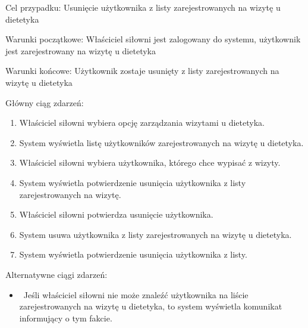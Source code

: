 \documentclass[
]{article}
\providecommand{\tightlist}{%
  \setlength{\itemsep}{0pt}\setlength{\parskip}{0pt}}
\begin{document}
{Cel przypadku: Usunięcie użytkownika z listy zarejestrowanych na wizytę
u dietetyka}

{Warunki początkowe: Właściciel siłowni jest zalogowany do systemu,
użytkownik jest zarejestrowany na wizytę u dietetyka}

{Warunki końcowe: Użytkownik zostaje usunięty z listy zarejestrowanych
na wizytę u dietetyka}

{Główny ciąg zdarzeń:}

\begin{enumerate}
\tightlist
\item
  {Właściciel siłowni wybiera opcję zarządzania wizytami u dietetyka.}
\item
  {System wyświetla listę użytkowników zarejestrowanych na wizytę u
  dietetyka.}
\item
  {Właściciel siłowni wybiera użytkownika, którego chce wypisać z
  wizyty.}
\item
  {System wyświetla potwierdzenie usunięcia użytkownika z listy
  zarejestrowanych na wizytę.}
\item
  {Właściciel siłowni potwierdza usunięcie użytkownika.}
\item
  {System usuwa użytkownika z listy zarejestrowanych na wizytę u
  dietetyka.}
\item
  {System wyświetla potwierdzenie usunięcia użytkownika z listy.}
\end{enumerate}

{Alternatywne ciągi zdarzeń:}

\begin{itemize}
\tightlist
\item
  {~Jeśli właściciel siłowni nie może znaleźć użytkownika na liście
  zarejestrowanych na wizytę u dietetyka, to system wyświetla komunikat
  informujący o tym fakcie.}
\end{itemize}

{}

{}

{}
\end{document}

